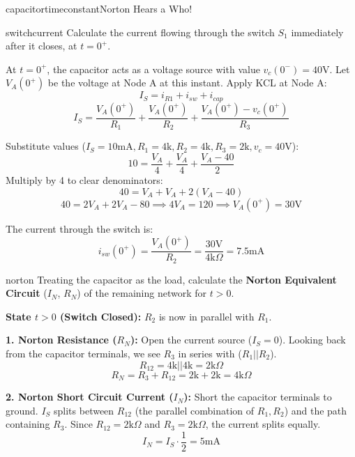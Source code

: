 \begin{mainquestion}{capacitortimeconstant}{Norton Hears a Who!}
\begin{partquestion}{switchcurrent}
{Calculate the current flowing through the switch $S_1$ immediately after it closes, at $t=0^+$.}

\begin{answer}[2in]
        At $t=0^+$, the capacitor acts as a voltage source with value $v_c(0^-) = 40\text{V}$.
        Let $V_A(0^+)$ be the voltage at Node A at this instant.
        Apply KCL at Node A:
        \[ I_S = i_{R1} + i_{sw} + i_{cap} \]
        \[ I_S = \frac{V_A(0^+)}{R_1} + \frac{V_A(0^+)}{R_2} + \frac{V_A(0^+) - v_c(0^+)}{R_3} \]
        
        Substitute values ($I_S=10\text{mA}, R_1=4\text{k}, R_2=4\text{k}, R_3=2\text{k}, v_c=40\text{V}$):
        \[ 10 = \frac{V_A}{4} + \frac{V_A}{4} + \frac{V_A - 40}{2} \]
        Multiply by 4 to clear denominators:
        \[ 40 = V_A + V_A + 2(V_A - 40) \]
        \[ 40 = 2V_A + 2V_A - 80 \implies 4V_A = 120 \implies V_A(0^+) = 30\text{V} \]
        
        The current through the switch is:
        \[ i_{sw}(0^+) = \frac{V_A(0^+)}{R_2} = \frac{30\text{V}}{4\text{k}\Omega} = 7.5\text{mA} \]
\end{answer}

\qnewpage
\end{partquestion}

\begin{partquestion}{norton}
{Treating the capacitor as the load, calculate the \textbf{Norton Equivalent Circuit} ($I_{N}$, $R_{N}$) of the remaining network for $t > 0$.}

\begin{answer}[3in]
        \textbf{State $t > 0$ (Switch Closed):}
        $R_2$ is now in parallel with $R_1$.
        
        \textbf{1. Norton Resistance ($R_N$):}
        Open the current source ($I_S = 0$). Looking back from the capacitor terminals, we see $R_3$ in series with ($R_1 || R_2$).
        \[ R_{12} = 4\text{k} || 4\text{k} = 2\text{k}\Omega \]
        \[ R_N = R_3 + R_{12} = 2\text{k} + 2\text{k} = 4\text{k}\Omega \]

        \textbf{2. Norton Short Circuit Current ($I_N$):}
        Short the capacitor terminals to ground. $I_S$ splits between $R_{12}$ (the parallel combination of $R_1, R_2$) and the path containing $R_3$.
        Since $R_{12} = 2\text{k}\Omega$ and $R_3 = 2\text{k}\Omega$, the current splits equally.
        \[ I_N = I_S \cdot \frac{1}{2} = 5\text{mA} \]
\end{answer}


\end{partquestion}
\end{mainquestion}
